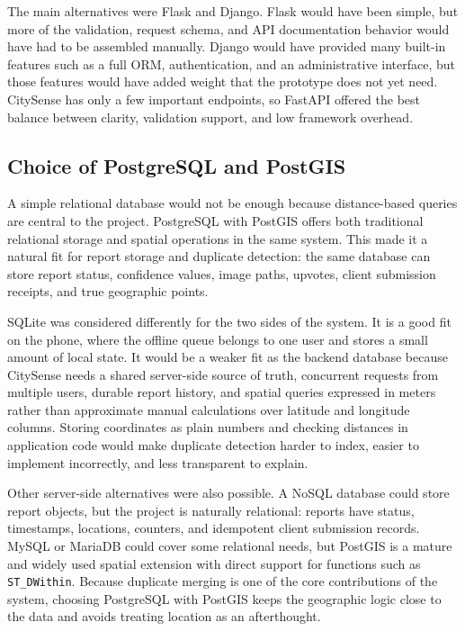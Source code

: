 The main alternatives were Flask and Django. Flask would have been simple, but more of the validation, request schema, and API documentation behavior would have had to be assembled manually. Django would have provided many built-in features such as a full ORM, authentication, and an administrative interface, but those features would have added weight that the prototype does not yet need. CitySense has only a few important endpoints, so FastAPI offered the best balance between clarity, validation support, and low framework overhead.

\subsection{Choice of PostgreSQL and PostGIS}

A simple relational database would not be enough because distance-based queries are central to the project. PostgreSQL with PostGIS offers both traditional relational storage and spatial operations in the same system. This made it a natural fit for report storage and duplicate detection: the same database can store report status, confidence values, image paths, upvotes, client submission receipts, and true geographic points.

SQLite was considered differently for the two sides of the system. It is a good fit on the phone, where the offline queue belongs to one user and stores a small amount of local state. It would be a weaker fit as the backend database because CitySense needs a shared server-side source of truth, concurrent requests from multiple users, durable report history, and spatial queries expressed in meters rather than approximate manual calculations over latitude and longitude columns. Storing coordinates as plain numbers and checking distances in application code would make duplicate detection harder to index, easier to implement incorrectly, and less transparent to explain.

Other server-side alternatives were also possible. A NoSQL database could store report objects, but the project is naturally relational: reports have status, timestamps, locations, counters, and idempotent client submission records. MySQL or MariaDB could cover some relational needs, but PostGIS is a mature and widely used spatial extension with direct support for functions such as \texttt{ST\_DWithin}. Because duplicate merging is one of the core contributions of the system, choosing PostgreSQL with PostGIS keeps the geographic logic close to the data and avoids treating location as an afterthought.

